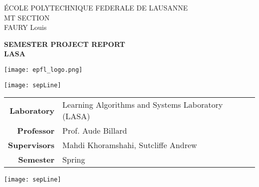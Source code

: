 





\begin{titlepage}
        	{\sffamily
	\large
        		\noindent \'ECOLE POLYTECHNIQUE FEDERALE DE LAUSANNE \\
        		MT SECTION\\
        		FAURY Louis \\
        	}
	
	\vfill 
        \begin{center}
   		{\sffamily\Huge
         		\textbf{SEMESTER PROJECT REPORT} \\
			\vspace{0.3cm}
			\Large
			\textbf{LASA}
		}
		\vspace{1cm}
	
        		\texttt{[image: epfl\_logo.png]}
        
        		\vspace{1cm}
         
         	\sffamily\huge\textbf{ 	
 }
        \end{center}
        
	\vspace{2cm}
         \centering\texttt{[image: sepLine]}
         \vspace{0.2cm}

	\large
        \begin{center}
		\begin{tabular}{rl}
    			\textbf{Laboratory} & Learning Algorithms and Systems Laboratory (LASA)\\
			\textbf{Professor} & Prof. Aude Billard \\
    			\textbf{Supervisors} & Mahdi Khoramshahi, Sutcliffe Andrew\\
			\textbf{Semester} & Spring\\
		\end{tabular}
	\end{center}
	\vspace{0.05cm}
         \centering\texttt{[image: sepLine]}
         \vspace{0.6cm}
         \vfill
\end{titlepage}

